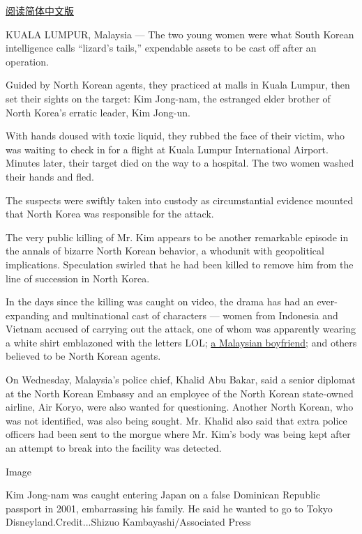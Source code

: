 \href{http://cn.nytimes.com/asia-pacific/20170223/kim-jong-nam-assassination-korea-malaysia/}{阅读简体中文版}

KUALA LUMPUR, Malaysia --- The two young women were what South Korean
intelligence calls ``lizard's tails,'' expendable assets to be cast off
after an operation.

Guided by North Korean agents, they practiced at malls in Kuala Lumpur,
then set their sights on the target: Kim Jong-nam, the estranged elder
brother of North Korea's erratic leader, Kim Jong-un.

With hands doused with toxic liquid, they rubbed the face of their
victim, who was waiting to check in for a flight at Kuala Lumpur
International Airport. Minutes later, their target died on the way to a
hospital. The two women washed their hands and fled.

The suspects were swiftly taken into custody as circumstantial evidence
mounted that North Korea was responsible for the attack.

The very public killing of Mr. Kim appears to be another remarkable
episode in the annals of bizarre North Korean behavior, a whodunit with
geopolitical implications. Speculation swirled that he had been killed
to remove him from the line of succession in North Korea.

In the days since the killing was caught on video, the drama has had an
ever-expanding and multinational cast of characters --- women from
Indonesia and Vietnam accused of carrying out the attack, one of whom
was apparently wearing a white shirt emblazoned with the letters LOL;
\href{https://www.nytimes.com/2017/02/15/world/asia/kim-jong-un-brother-assassination-north-korea.html}{a
Malaysian boyfriend}; and others believed to be North Korean agents.

On Wednesday, Malaysia's police chief, Khalid Abu Bakar, said a senior
diplomat at the North Korean Embassy and an employee of the North Korean
state-owned airline, Air Koryo, were also wanted for questioning.
Another North Korean, who was not identified, was also being sought. Mr.
Khalid also said that extra police officers had been sent to the morgue
where Mr. Kim's body was being kept after an attempt to break into the
facility was detected.

Image

Kim Jong-nam was caught entering Japan on a false Dominican Republic
passport in 2001, embarrassing his family. He said he wanted to go to
Tokyo Disneyland.Credit...Shizuo Kambayashi/Associated Press

